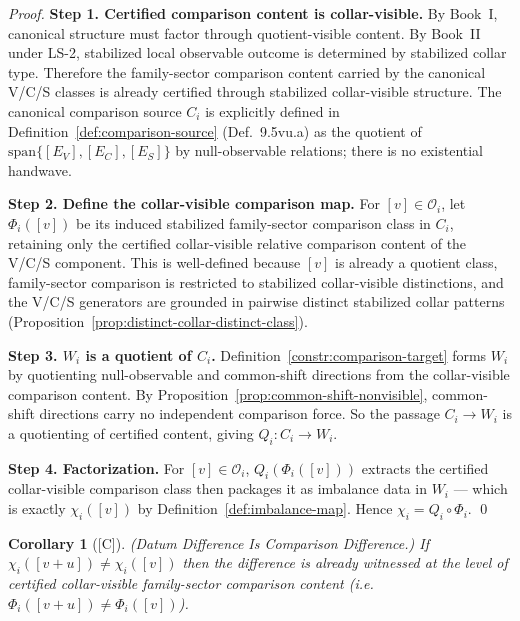 \documentclass[12pt,oneside]{amsbook}
\theoremstyle{plain}
\newtheorem{corollary}[theorem]{Corollary}
\theoremstyle{definition}
\theoremstyle{remark}
\newcommand{\status}[1]{\textup{[#1]}}
\begin{document}
\begin{proof}
\textbf{Step 1. Certified comparison content is collar-visible.}
By Book~I, canonical structure must factor through quotient-visible
content.  By Book~II under LS-2, stabilized local observable
outcome is determined by stabilized collar type.  Therefore the
family-sector comparison content carried by the canonical V/C/S
classes is already certified through stabilized collar-visible
structure.  The canonical comparison source $C_i$ is explicitly
defined in Definition~\ref{def:comparison-source} (Def.~9.5vu.a)
as the quotient of $\mathrm{span}\{[E_V],[E_C],[E_S]\}$ by
null-observable relations; there is no existential handwave.

\textbf{Step 2. Define the collar-visible comparison map.}
For $[v] \in \mathcal{O}_i$, let $\Phi_i([v])$ be its induced
stabilized family-sector comparison class in $C_i$, retaining only
the certified collar-visible relative comparison content of the V/C/S
component.  This is well-defined because $[v]$ is already a quotient
class, family-sector comparison is restricted to stabilized
collar-visible distinctions, and the V/C/S generators are grounded in
pairwise distinct stabilized collar patterns
(Proposition~\ref{prop:distinct-collar-distinct-class}).

\textbf{Step 3. $W_i$ is a quotient of $C_i$.}
Definition~\ref{constr:comparison-target} forms $W_i$ by quotienting
null-observable and common-shift directions from the
collar-visible comparison content.  By
Proposition~\ref{prop:common-shift-nonvisible}, common-shift
directions carry no independent comparison force.  So the passage
$C_i \to W_i$ is a quotienting of certified content, giving
$Q_i : C_i \to W_i$.

\textbf{Step 4. Factorization.}
For $[v] \in \mathcal{O}_i$, $Q_i(\Phi_i([v]))$ extracts the
certified collar-visible comparison class then packages it as
imbalance data in $W_i$ — which is exactly $\chi_i([v])$ by
Definition~\ref{def:imbalance-map}.  Hence $\chi_i = Q_i \circ
\Phi_i$. \qed
\end{proof}

\begin{corollary}[\status{C}]\label{cor:datum-difference-comparison}
\textup{(Datum Difference Is Comparison Difference.)}
If $\chi_i([v+u]) \neq \chi_i([v])$ then the difference is already
witnessed at the level of certified collar-visible family-sector
comparison content (i.e.\ $\Phi_i([v+u]) \neq \Phi_i([v])$).
\end{corollary}
\end{document}

